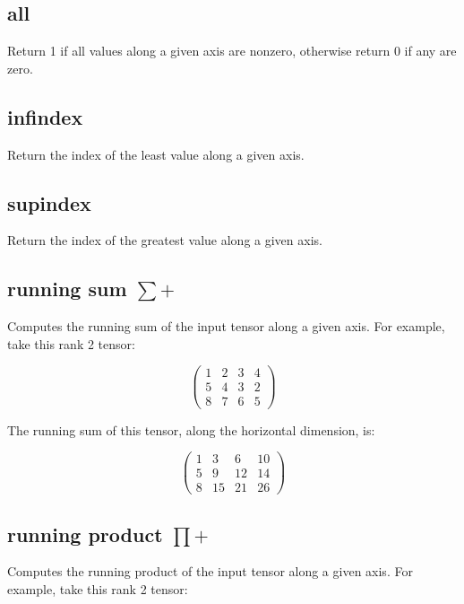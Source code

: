 \subsection{all}\label{Operation:all} Return 1 if all values
along a given axis are nonzero, otherwise return 0 if any are zero. 

\subsection{infindex}\label{Operation:infindex} Return the index of
the least value along a given axis.

\subsection{supindex}\label{Operation:supindex} Return the index of
the greatest value along a given axis.

\subsection{running sum $\sum+$}\label{Operation:runningSum} Computes
the running sum of the input tensor along a given axis. For example, take
this rank 2 tensor:

\begin{displaymath}
  \left(
  \begin{array}{cccc}
    1& 2& 3& 4 \\
    5& 4& 3& 2 \\
    8& 7& 6& 5
  \end{array}
  \right)
\end{displaymath}

The running sum of this tensor, along the horizontal dimension, is: 

\begin{displaymath}
  \left(
  \begin{array}{cccc}
    1& 3& 6& 10 \\
    5& 9& 12& 14 \\
    8& 15& 21& 26
  \end{array}
  \right)
\end{displaymath}

\subsection{running product $\prod+$}
\label{Operation:runningProduct} Computes the running
product of the input tensor along a given axis. For example, take
this rank 2 tensor:

